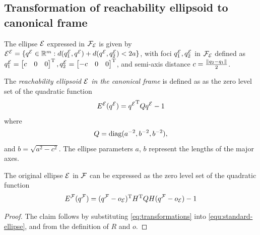 \documentclass[10pt,twocolumn,twoside]{IEEEtran}
\newcommand{\news}{\color{blue}}
\begin{document}

\appendix
{\news
\subsection{Transformation of reachability ellipsoid to canonical frame}\label{apx:transformation}
The ellipse $\mathcal{E}$ expressed in $\mathcal{F}_{\mathcal{E}}$ is given by ${\mathcal{E}^{\mathcal{E}}}=\{{q^{\mathcal{E}}}\in\mathbb{R}^{m}{}:d(q^{\mathcal{E}}_1,{q^{\mathcal{E}}})+d({q^{\mathcal{E}}},q^{\mathcal{E}}_2)<2a\}$, with foci $q^{\mathcal{E}}_1,q^{\mathcal{E}}_2$ in $\mathcal{F}_{\mathcal{E}}$ defined as
$q^{\mathcal{E}}_1=\begin{bmatrix}c & 0 & 0\end{bmatrix}^\mathrm{T}, q^{\mathcal{E}}_2=\begin{bmatrix}-c & 0 & 0\end{bmatrix}^\mathrm{T}$, and semi-axis distance $c=\frac{\lVert q_2-q_1\rVert}{2}$.
\begin{definition}
  The \emph{reachability ellipsoid $\mathcal{E}$ in the canonical frame} is defined as as the zero level set of the quadratic function
  \begin{equation}\label{equ:standard-ellipse}
    {E^{\mathcal{E}}}({q^{\mathcal{E}}}) = {q^{\mathcal{E}}}^\mathrm{T} Q {q^{\mathcal{E}}} - 1
  \end{equation}
  where
  \begin{equation}
    Q = \operatorname{diag}(a^{-2},b^{-2},b^{-2}),
  \end{equation}
  and $b = \sqrt{a^2-c^2}$.
  The ellipse parameters $a$, $b$ represent the lengths of the major axes.
\end{definition}
\begin{lemma}
The original ellipse $\mathcal{E}$ in $\mathcal{F}$ can be expressed as the zero level set of the quadratic function
   \begin{equation}\label{eq:ellpsoid from canonical}
     {E^{\mathcal{F}}}({q^{\mathcal{F}}}) = ({q^{\mathcal{F}}}-o_{\mathcal{E}})^\mathrm{T} H^\mathrm{T} Q H ({q^{\mathcal{F}}}-o_{\mathcal{E}}) - 1
     \end{equation}
\end{lemma}
\begin{proof}
    The claim follows by substituting  \eqref{eq:transformations} into \eqref{equ:standard-ellipse}, and from the definition of $R$ and $o$.
\end{proof}
}
\end{document}
